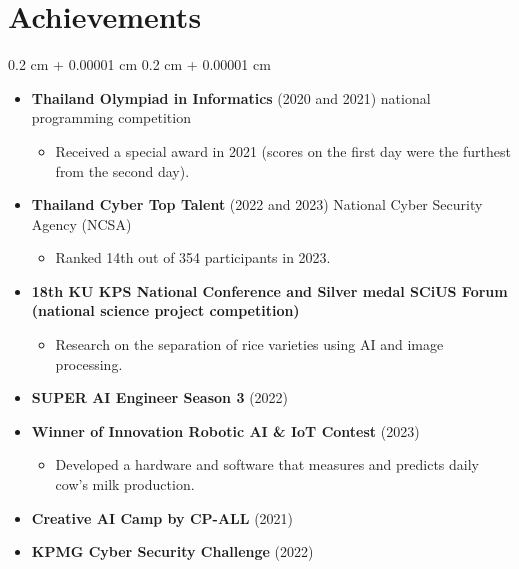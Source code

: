 \documentclass[10pt,letterpaper]{extarticle}
\newenvironment{highlights}{
    \begin{itemize}[
        topsep=0.10 cm,
        parsep=0.10 cm,
        partopsep=0pt,
        itemsep=0pt,
        leftmargin=0.4 cm + 10pt
    ]
}{
    \end{itemize}
} %
\newenvironment{onecolentry}{
    \begin{adjustwidth}{
        0.2 cm + 0.00001 cm
    }{
        0.2 cm + 0.00001 cm
    }
}{
    \end{adjustwidth}
} %
\begin{document}
    \section{Achievements}
        \begin{onecolentry}
            \begin{highlights}
                \item \textbf{Thailand Olympiad in Informatics} (2020 and 2021) national programming competition
                    \begin{highlights}
                        \item Received a special award in 2021 (scores on the first day were the furthest from the second day).
                    \end{highlights}
                
                \item \textbf{Thailand Cyber Top Talent} (2022 and 2023) National Cyber Security Agency (NCSA)
                    \begin{highlights}
                        \item Ranked 14th out of 354 participants in 2023.
                    \end{highlights}

                \item \textbf{18th KU KPS National Conference and Silver medal SCiUS Forum (national science project competition)}
                    \begin{highlights}
                        \item Research on the separation of rice varieties using AI and image processing.
                    \end{highlights}
                \item \textbf{SUPER AI Engineer Season 3} (2022)

                \item \textbf{Winner of Innovation Robotic AI \& IoT Contest} (2023)
                    \begin{highlights}
                        \item Developed a hardware and software that measures and predicts daily cow's milk production.
                    \end{highlights}

                \item \textbf{Creative AI Camp by CP-ALL} (2021)

                \item \textbf{KPMG Cyber Security Challenge} (2022)

            \end{highlights}
        \end{onecolentry}
\end{document}
